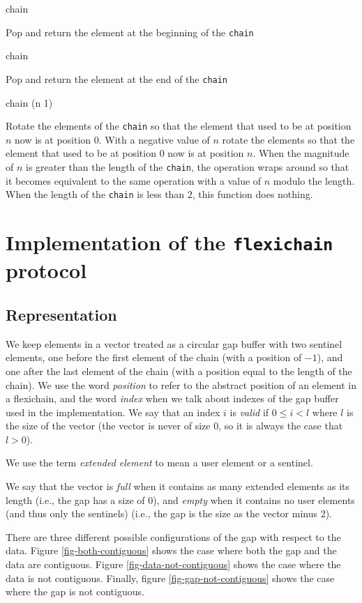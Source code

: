\documentclass[11pt]{article}
\begin{document}
 {chain}

Pop and return the element at the beginning of the \texttt{chain}

 {chain}

Pop and return the element at the end of the \texttt{chain}

 {chain \optional (n 1)}

Rotate the elements of the \texttt{chain} so that the element that used
to be at position $n$ now is at position $0$.  With a negative value
of $n$ rotate the elements so that the element that used to be at
position $0$ now is at position $n$.  When the magnitude of $n$ is
greater than the length of the \texttt{chain}, the operation wraps
around so that it becomes equivalent to the same operation with a
value of $n$ modulo the length.  When the length of the \texttt{chain}
is less than $2$, this function does nothing.

\section{Implementation of the \texttt{flexichain} protocol}

\subsection{Representation}

We keep elements in a vector treated as a circular gap buffer with two
sentinel elements, one before the first element of the chain (with a
position of $-1$), and one after the last element of the chain (with a
position equal to the length of the chain).  We use the word
\textit{position} to refer to the abstract position of an element in a
flexichain, and the word \textit{index} when we talk about indexes of
the gap buffer used in the implementation.  We say that an index $i$
is \emph{valid} if $0 \le i < l$ where $l$ is the size of the vector
(the vector is never of size $0$, so it is always the case that $l >
0$).

We use the term \emph{extended element} to mean a user element or a
sentinel.

We say that the vector is \textit{full} when it contains as many
extended elements as its length (i.e., the gap has a size of $0$), and
\textit{empty} when it contains no user elements (and thus only the
sentinels) (i.e., the gap is the size as the vector minus
2).

There are three different possible configurations of the gap with
respect to the data.  Figure \ref{fig-both-contiguous} shows the case
where both the gap and the data are contiguous.  Figure
\ref{fig-data-not-contiguous} shows the case where the data is not
contiguous.  Finally, figure \ref{fig-gap-not-contiguous} shows the
case where the gap is not contiguous.
\end{document}

